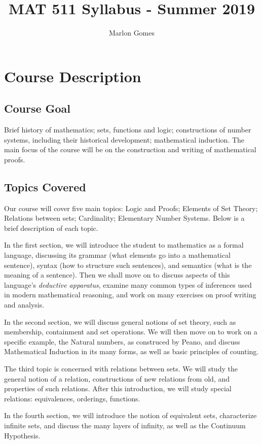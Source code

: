\documentclass[11pt]{amsart}
\title[MAT 511 Syllabus - Summer 2019]{MAT 511 Syllabus - Summer 2019}
\author[M. Gomes]{Marlon Gomes}
\numberwithin{equation}{section}
\begin{document}
\maketitle

\section{Course Description}
\subsection{Course Goal}
Brief history of mathematics; sets, functions and logic; constructions of number systems, including their historical development; mathematical induction. The main focus of the course will be on the construction and writing of mathematical proofs. 

\subsection{Topics Covered}
Our course will cover five main topics: Logic and Proofs; Elements of Set Theory; Relations between sets; Cardinality; Elementary Number Systems. Below is a brief description of each topic. 

In the first section, we will introduce the student to mathematics as a formal language, discussing its grammar (what elements go into a mathematical sentence), syntax (how to structure such sentences), and semantics (what is the meaning of a sentence). Then we shall move on to discuss aspects of this language's \textit{deductive apparatus}, examine many common types of inferences used in modern mathematical reasoning, and work on many exercises on proof writing and analysis.

In the second section, we will discuss general notions of set theory, such as membership, containment and set operations. We will then move on to work on a specific example, the Natural numbers, as construced by Peano, and discuss Mathematical Induction in its many forms, as well as basic principles of counting.

The third topic is concerned with relations between sets. We will study the general notion of a relation, constructions of new relations from old, and properties of such relations. After this introduction, we will study special relations: equivalences, orderings, functions.

In the fourth section, we will introduce the notion of equivalent sets, characterize infinite sets, and discuss the many layers of infinity, as well as the Continuum Hypothesis.
\end{document}
